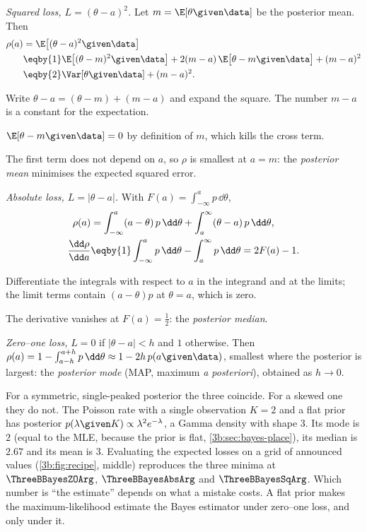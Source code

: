 \emph{Squared loss, $L=(\theta-a)^2$.} Let $m=\E[\theta\given\data]$ be the
posterior mean. Then
\begin{align}
  \rho(a)&=\E\bigl[(\theta-a)^2\given\data\bigr]\\
   &\eqby{1}\E\bigl[(\theta-m)^2\given\data\bigr]
     +2(m-a)\,\E\bigl[\theta-m\given\data\bigr]+(m-a)^2\\
   &\eqby{2}\Var[\theta\given\data]+(m-a)^2 .
  \label{3b:eq:bayes-squared}
\end{align}
\begin{explain}
  \item Write $\theta-a=(\theta-m)+(m-a)$ and expand the square. The number
        $m-a$ is a constant for the expectation.
  \item $\E[\theta-m\given\data]=0$ by definition of $m$, which kills the cross term.
\end{explain}
The first term does not depend on $a$, so $\rho$ is smallest at $a=m$: the
\emph{posterior mean} minimises the expected squared error.

\emph{Absolute loss, $L=|\theta-a|$.} With $F(a)=\int_{-\infty}^ap\,\dd\theta$,
\begin{align*}
  \rho(a)&=\int_{-\infty}^{a}(a-\theta)\,p\,\dd\theta+\int_a^\infty(\theta-a)\,p\,\dd\theta,\\
  \frac{\dd\rho}{\dd a}&\eqby{1}\int_{-\infty}^{a}p\,\dd\theta-\int_a^\infty p\,\dd\theta
   =2F(a)-1 .
\end{align*}
\begin{explain}
  \item Differentiate the integrals with respect to $a$ in the integrand and
        at the limits; the limit terms contain $(a-\theta)p$ at $\theta=a$, which is zero.
\end{explain}
The derivative vanishes at $F(a)=\tfrac12$: the \emph{posterior median}.

\emph{Zero--one loss,} $L=0$ if $|\theta-a|<h$ and $1$ otherwise. Then
$\rho(a)=1-\int_{a-h}^{a+h}p\,\dd\theta\approx1-2h\,p(a\given\data)$, smallest
where the posterior is largest: the \emph{posterior mode} (MAP, maximum
\emph{a posteriori}), obtained as $h\to0$.

For a symmetric, single-peaked posterior the three coincide. For a skewed
one they do not. The Poisson rate with a single observation $K=2$ and a flat
prior has posterior $p(\lambda\given K)\propto\lambda^2e^{-\lambda}$, a
Gamma density with shape $3$. Its mode is $2$ (equal to the MLE, because the
prior is flat, \cref{3b:sec:bayes-place}), its median is $2.67$ and its
mean is $3$. Evaluating the expected losses on a grid of announced values
(\cref{3b:fig:recipe}, middle) reproduces the three minima at
$\ThreeBBayesZOArg$, $\ThreeBBayesAbsArg$ and $\ThreeBBayesSqArg$. Which
number is ``the estimate'' depends on what a mistake costs. A flat prior
makes the maximum-likelihood estimate the Bayes estimator under zero--one
loss, and only under it.

